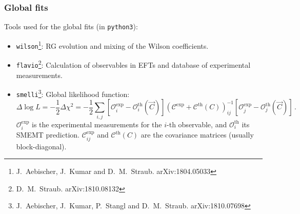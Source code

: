 \documentclass[mathserif, 10pt]{beamer}
\begin{document}
\begin{frame}
    \frametitle{Global fits}

    Tools used for the global fits (in \texttt{python3}):
    \begin{itemize}
        \item \texttt{wilson}\footnote[1]{J.~Aebischer, J.~Kumar and D.~M.~Straub. arXiv:1804.05033}: RG evolution and mixing of the Wilson coefficients.
        \item \texttt{flavio}\footnote[2]{D.~M.~Straub. arXiv:1810.08132}: Calculation of observables in EFTs and database of experimental measurements.
        \item \texttt{smelli}\footnote[3]{J.~Aebischer, J.~Kumar, P.~Stangl and D.~M.~Straub. arXiv:1810.07698}: Global likelihood function:
              {\small$$\Delta \log L = -\frac{1}{2}\Delta\chi^2 = -\frac{1}{2}\sum_{i,j} [\mathcal{O}_i^\mathrm{exp} - \mathcal{O}^\mathrm{th}_i(\vec{C})] (\mathcal{C}^\mathrm{exp}+\mathcal{C}^\mathrm{th}(C))^{-1}_{ij} [\mathcal{O}_j^\mathrm{exp} - \mathcal{O}^\mathrm{th}_j(\vec{C})]\,. $$} %
            $\mathcal{O}_i^\mathrm{exp}$ is the experimental measurements for the $i$-th observable, and $\mathcal{O}_i^\mathrm{th}$ its SMEMT prediction. $\mathcal{C}_{ij}^\mathrm{exp}$ and $\mathcal{C}^\mathrm{th}(C)$ are the covariance matrices (usually block-diagonal).%
    \end{itemize}

\end{frame}
\end{document}
